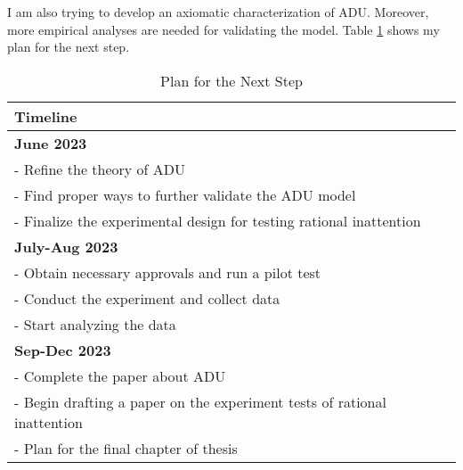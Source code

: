 \documentclass[
  12pt,
]{article}
\begin{document}
I am also trying to develop an axiomatic characterization of ADU.
Moreover, more empirical analyses are needed for validating the model.
Table \ref{tab:next} shows my plan for the next step.

    \begin{longtable}{@{}l@{}}
    \caption{Plan for the Next Step}
    \label{tab:next}\\
    \toprule
    \textbf{Timeline} \\* \midrule
    \endhead
    \bottomrule
    \endfoot
    \endlastfoot
    \textbf{June 2023} \\
      \quad - Refine the theory of ADU \\
      \quad - Find proper ways to further validate the ADU model \\
      \quad - Finalize the experimental design for testing rational inattention \\
    \textbf{July-Aug 2023} \\
      \quad - Obtain necessary approvals and run a pilot test \\
      \quad - Conduct the experiment and collect data \\
      \quad - Start analyzing the data \\
    \textbf{Sep-Dec 2023} \\
      \quad - Complete the paper about ADU \\
      \quad - Begin drafting a paper on the experiment tests of rational inattention \\
      \quad - Plan for the final chapter of thesis \\* \bottomrule
    \end{longtable}

\renewcommand\refname{Reference}
  
\end{document}
